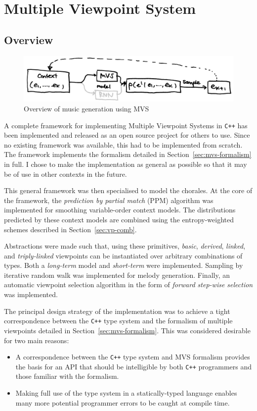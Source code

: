 \documentclass[12pt,a4paper,twoside,openright]{report}
\begin{document}
\section{Multiple Viewpoint System}

\subsection{Overview}

\begin{figure}[H]
\centering
\includegraphics[width=400pt]{figs/high_level_mvs_tmp.jpg}
\caption{Overview of music generation using MVS}
\label{fig:mvs-gen-overview}
\end{figure}

A complete framework for implementing Multiple Viewpoint Systems in \verb!C++!
has been implemented and released as an open source project for others to use.
Since no existing framework was available, this had to be implemented from
scratch. The framework implements the formalism detailed in
Section~\ref{sec:mvs-formalism} in full. I chose to make the implementation as
general as possible so that it may be of use in other contexts in the future. 

This general framework was then specialised to model the chorales. At the core
of the framework, the \emph{prediction by partial match} (PPM) algorithm was
implemented for smoothing variable-order context models. The distributions
predicted by these context models are combined using the entropy-weighted
schemes described in Section~\ref{sec:vp-comb}.

Abstractions were made such that, using these primitives, \emph{basic},
\emph{derived}, \emph{linked}, and \emph{triply-linked} viewpoints can be
instantiated over arbitrary combinations of types. Both a \emph{long-term} model
and \emph{short-term} were implemented.  Sampling by iterative random walk was
implemented for melody generation. Finally, an automatic viewpoint selection
algorithm in the form of \emph{forward step-wise selection}
\cite{pearce2005construction} was implemented.

The principal design strategy of the implementation was to achieve a tight
correspondence between the \texttt{C++} type system and the formalism of
multiple viewpoints detailed in Section~\ref{sec:mvs-formalism}. This was
considered desirable for two main reasons:
\begin{itemize}
  \item A correspondence between the \texttt{C++} type system and MVS formalism
    provides the basis for an API that should be intelligible by both
    \texttt{C++} programmers and those familiar with the formalism.
  \item Making full use of the type system in a statically-typed language 
    enables many more potential programmer errors to be caught at compile time.
\end{itemize}
\end{document}
